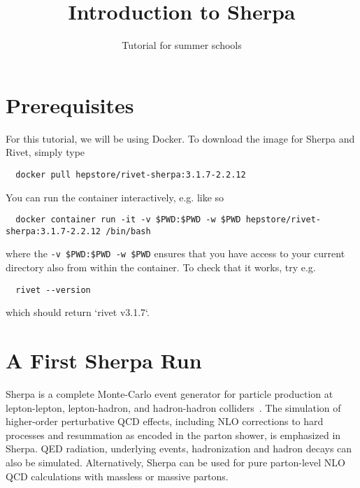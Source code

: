 \documentclass[10pt]{article}
\begin{document}
\title{{\Huge\bf Introduction to Sherpa}}
\author{{\Large Tutorial for summer schools}}
\date{}
\maketitle

\section{Prerequisites}

For this tutorial, we will be using Docker. To download the image for Sherpa and Rivet, simply type
\begin{verbatim}
  docker pull hepstore/rivet-sherpa:3.1.7-2.2.12
\end{verbatim}
%
You can run the container interactively, e.g. like so
%
\begin{verbatim}
  docker container run -it -v $PWD:$PWD -w $PWD hepstore/rivet-sherpa:3.1.7-2.2.12 /bin/bash
\end{verbatim}
%
where the \texttt{-v \$PWD:\$PWD -w \$PWD} ensures that you have access to your current directory also from within the container.
To check that it works, try e.g.
\begin{verbatim}
  rivet --version
\end{verbatim}
which should return `rivet v3.1.7`.

\section{A First Sherpa Run}

Sherpa is a complete Monte-Carlo event generator for particle production at
lepton-lepton, lepton-hadron, and hadron-hadron colliders~\cite{Gleisberg:2008ta}.
The simulation of higher-order perturbative QCD effects, including NLO corrections
to hard processes and resummation as encoded in the parton shower, is emphasized
in Sherpa. QED radiation, underlying events, hadronization and hadron decays can
also be simulated. Alternatively, Sherpa can be used for pure parton-level NLO QCD
calculations with massless or massive partons.
\end{document}
